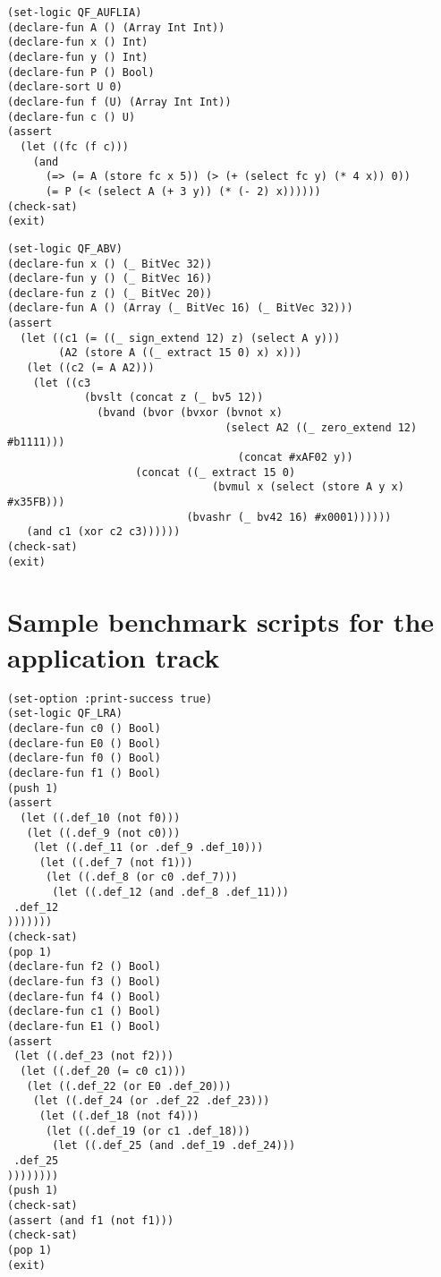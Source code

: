 \documentclass[12pt]{article}
\begin{document}

{\footnotesize
\begin{verbatim}
(set-logic QF_AUFLIA)
(declare-fun A () (Array Int Int))
(declare-fun x () Int)
(declare-fun y () Int)
(declare-fun P () Bool)
(declare-sort U 0)
(declare-fun f (U) (Array Int Int))
(declare-fun c () U)
(assert
  (let ((fc (f c)))
    (and
      (=> (= A (store fc x 5)) (> (+ (select fc y) (* 4 x)) 0))
      (= P (< (select A (+ 3 y)) (* (- 2) x))))))
(check-sat)
(exit)
\end{verbatim}}



\footnotesize
\begin{verbatim}
(set-logic QF_ABV)
(declare-fun x () (_ BitVec 32))
(declare-fun y () (_ BitVec 16))
(declare-fun z () (_ BitVec 20))
(declare-fun A () (Array (_ BitVec 16) (_ BitVec 32)))
(assert
  (let ((c1 (= ((_ sign_extend 12) z) (select A y)))
        (A2 (store A ((_ extract 15 0) x) x)))
   (let ((c2 (= A A2)))
    (let ((c3 
            (bvslt (concat z (_ bv5 12)) 
              (bvand (bvor (bvxor (bvnot x) 
                                  (select A2 ((_ zero_extend 12) #b1111)))
                                    (concat #xAF02 y))
                    (concat ((_ extract 15 0) 
                                (bvmul x (select (store A y x) #x35FB))) 
                            (bvashr (_ bv42 16) #x0001))))))
   (and c1 (xor c2 c3))))))
(check-sat)
(exit)
\end{verbatim}

\section{Sample benchmark scripts for the application track}

\footnotesize
\begin{verbatim}
(set-option :print-success true)
(set-logic QF_LRA)
(declare-fun c0 () Bool)
(declare-fun E0 () Bool)
(declare-fun f0 () Bool)
(declare-fun f1 () Bool)
(push 1)
(assert 
  (let ((.def_10 (not f0)))
   (let ((.def_9 (not c0)))
    (let ((.def_11 (or .def_9 .def_10)))
     (let ((.def_7 (not f1)))
      (let ((.def_8 (or c0 .def_7)))
       (let ((.def_12 (and .def_8 .def_11)))
 .def_12
)))))))
(check-sat)
(pop 1)
(declare-fun f2 () Bool)
(declare-fun f3 () Bool)
(declare-fun f4 () Bool)
(declare-fun c1 () Bool)
(declare-fun E1 () Bool)
(assert 
 (let ((.def_23 (not f2)))
  (let ((.def_20 (= c0 c1)))
   (let ((.def_22 (or E0 .def_20)))
    (let ((.def_24 (or .def_22 .def_23)))
     (let ((.def_18 (not f4)))
      (let ((.def_19 (or c1 .def_18)))
       (let ((.def_25 (and .def_19 .def_24)))
 .def_25
))))))))
(push 1)
(check-sat)
(assert (and f1 (not f1)))
(check-sat)
(pop 1)
(exit)
\end{verbatim}
\end{document}
